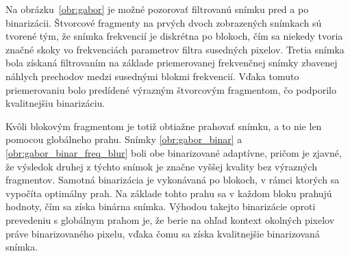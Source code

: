   Na obrázku~{\ref{obr:gabor}}
  je možné pozorovať filtrovanú snímku pred a po binarizácii. Štvorcové fragmenty na prvých dvoch zobrazených snímkach sú tvorené tým, že snímka frekvencií je
  diskrétna po blokoch, čím sa niekedy tvoria značné skoky vo frekvenciách parametrov filtra susedných pixelov. Tretia snímka bola získaná filtrovaním na základe
  priemerovanej frekvenčnej snímky zbavenej náhlych prechodov medzi susednými blokmi frekvencií. Vďaka tomuto priemerovaniu bolo predídené výrazným štvorcovým
  fragmentom, čo podporilo kvalitnejšiu binarizáciu.

  Kvôli blokovým fragmentom je totiž obtiažne prahovať snímku, a to nie len pomocou globálneho prahu. Snímky \ref{obr:gabor_binar} a
  \ref{obr:gabor_binar_freq_blur} boli obe binarizované adaptívne, pričom je zjavné, že výsledok druhej z týchto snímok je značne vyššej kvality bez výrazných
  fragmentov. Samotná binarizácia je vykonávaná po blokoch, v rámci ktorých sa vypočíta optimálny prah. Na základe tohto prahu sa v každom bloku prahujú hodnoty,
  čím sa získa binárna snímka. Výhodou takejto binarizácie oproti prevedeniu s globálnym prahom je, že berie na ohľad kontext okolných pixelov práve
  binarizovaného pixelu, vďaka čomu sa získa kvalitnejšie binarizovaná snímka.

